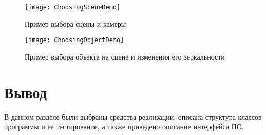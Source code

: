 \begin{figure}[H]
	\centering
	\texttt{[image: ChoosingSceneDemo]}
	\caption{Пример выбора сцены и камеры}
	\label{fig:ChoosingSceneDemo}
\end{figure}

\begin{figure}[H]
	\centering
	\texttt{[image: ChoosingObjectDemo]}
	\caption{Пример выбора объекта на сцене и изменения его зеркальности}
	\label{fig:ChoosingObjectDemo}
\end{figure}

\section*{Вывод}
В данном разделе были выбраны средства реализации, описана структура классов программы и ее тестирование, а также приведено описание интерфейса ПО.

\clearpage
